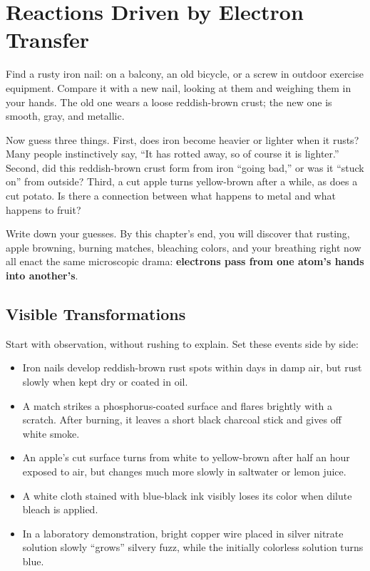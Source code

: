 \chapter{Reactions Driven by Electron Transfer}

\begin{kaichang}
Find a rusty iron nail: on a balcony, an old bicycle, or a screw in outdoor exercise equipment. Compare it with a new nail, looking at them and weighing them in your hands. The old one wears a loose reddish-brown crust; the new one is smooth, gray, and metallic.

Now guess three things. First, does iron become heavier or lighter when it rusts? Many people instinctively say, ``It has rotted away, so of course it is lighter.'' Second, did this reddish-brown crust form from iron ``going bad,'' or was it ``stuck on'' from outside? Third, a cut apple turns yellow-brown after a while, as does a cut potato. Is there a connection between what happens to metal and what happens to fruit?

Write down your guesses. By this chapter's end, you will discover that rusting, apple browning, burning matches, bleaching colors, and your breathing right now all enact the same microscopic drama: \textbf{electrons pass from one atom's hands into another's}.
\end{kaichang}

\section{Visible Transformations}

Start with observation, without rushing to explain. Set these events side by side:

\begin{itemize}[itemsep=2pt]
\item Iron nails develop reddish-brown rust spots within days in damp air, but rust slowly when kept dry or coated in oil.
\item A match strikes a phosphorus-coated surface and flares brightly with a scratch. After burning, it leaves a short black charcoal stick and gives off white smoke.
\item An apple's cut surface turns from white to yellow-brown after half an hour exposed to air, but changes much more slowly in saltwater or lemon juice.
\item A white cloth stained with blue-black ink visibly loses its color when dilute bleach is applied.
\item In a laboratory demonstration, bright copper wire placed in silver nitrate solution slowly ``grows'' silvery fuzz, while the initially colorless solution turns blue.
\end{itemize}

